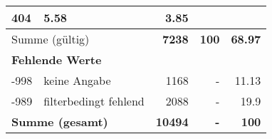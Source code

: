 \begin{longtable}{lXrrr}
       \num{404} &
       \num[round-mode=places,round-precision=2]{5.58} &
         \num[round-mode=places,round-precision=2]{3.85} \\
     \midrule
     \multicolumn{2}{l}{Summe (gültig)} &
       \textbf{\num{7238}} &
     \textbf{\num{100}} &
       \textbf{\num[round-mode=places,round-precision=2]{68.97}} \\
     \multicolumn{5}{l}{\textbf{Fehlende Werte}}\\
       -998 &
       keine Angabe &
         \num{1168} &
        - &
         \num[round-mode=places,round-precision=2]{11.13} \\
       -989 &
       filterbedingt fehlend &
         \num{2088} &
        - &
         \num[round-mode=places,round-precision=2]{19.9} \\
     \midrule
     \multicolumn{2}{l}{\textbf{Summe (gesamt)}} &
          \textbf{\num{10494}} &
        \textbf{-} &
        \textbf{\num{100}} \\
     \bottomrule
     \end{longtable}
     
